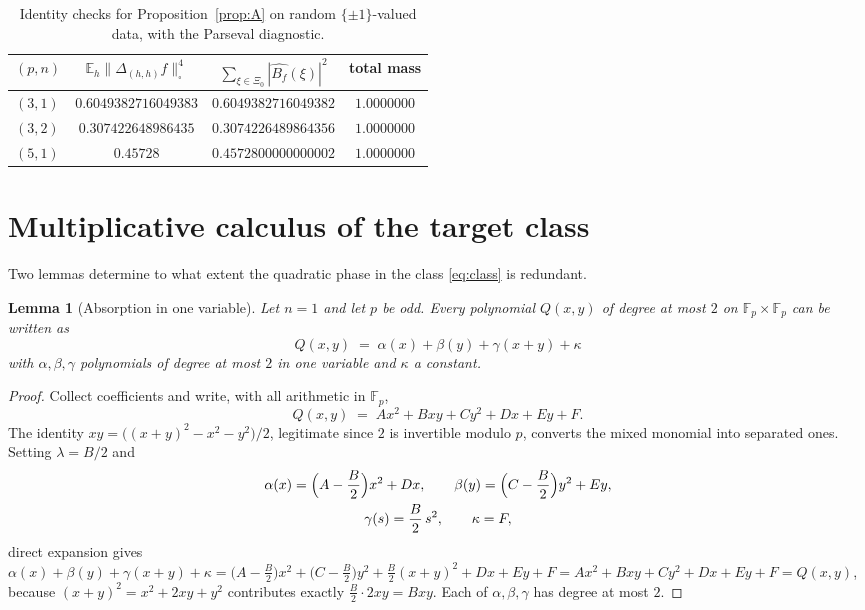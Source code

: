 \documentclass[11pt]{article}
\newtheorem{lemma}{Lemma}
\theoremstyle{remark}
\begin{document}
\begin{table}[ht]
\centering
\small
\begin{tabular}{lccc}
\toprule
$(p,n)$ &
$\mathbb{E}_h\|\Delta_{(h,h)}f\|_\square^4$ &
$\sum_{\xi\in\Xi_0}|\widehat{B_f}(\xi)|^2$ &
total mass \\
\midrule
$(3,1)$ & $0.6049382716049383$ & $0.6049382716049382$ & $1.0000000$ \\
$(3,2)$ & $0.307422648986435$  & $0.3074226489864356$ & $1.0000000$ \\
$(5,1)$ & $0.45728$            & $0.4572800000000002$ & $1.0000000$ \\
\bottomrule
\end{tabular}
\caption{Identity checks for Proposition~\ref{prop:A} on random
$\{\pm1\}$-valued data, with the Parseval diagnostic.}
\label{tab:ident}
\end{table}

\section{Multiplicative calculus of the target class}\label{sec:calc}

Two lemmas determine to what extent the quadratic phase in the class
\eqref{eq:class} is redundant.

\begin{lemma}[Absorption in one variable]\label{lem:absorb}
Let $n=1$ and let $p$ be odd. Every polynomial $Q(x,y)$ of degree at most
$2$ on $\mathbb{F}_p\times\mathbb{F}_p$ can be written as
\[
Q(x,y)\;=\;\alpha(x)+\beta(y)+\gamma(x+y)+\kappa
\]
with $\alpha,\beta,\gamma$ polynomials of degree at most $2$ in one variable
and $\kappa$ a constant.
\end{lemma}

\begin{proof}
Collect coefficients and write, with all arithmetic in $\mathbb{F}_p$,
\[
Q(x,y)\;=\;A x^2+B xy+C y^2+Dx+Ey+F.
\]
The identity $xy=\bigl((x+y)^2-x^2-y^2\bigr)/2$, legitimate since $2$ is
invertible modulo $p$, converts the mixed monomial into separated ones.
Setting $\lambda=B/2$ and
\begin{gather*}
\alpha(x)=\Bigl(A-\frac{B}{2}\Bigr)x^2+Dx,\qquad
\beta(y)=\Bigl(C-\frac{B}{2}\Bigr)y^2+Ey,\\
\gamma(s)=\frac{B}{2}\,s^2,\qquad
\kappa=F,
\end{gather*}
direct expansion gives
$\alpha(x)+\beta(y)+\gamma(x+y)+\kappa
=\bigl(A-\tfrac{B}{2}\bigr)x^2+\bigl(C-\tfrac{B}{2}\bigr)y^2
+\tfrac{B}{2}(x+y)^2+Dx+Ey+F
=Ax^2+Bxy+Cy^2+Dx+Ey+F=Q(x,y)$,
because $(x+y)^2=x^2+2xy+y^2$ contributes exactly
$\tfrac{B}{2}\cdot 2xy=Bxy$. Each of $\alpha,\beta,\gamma$ has degree at
most $2$.
\end{proof}
\end{document}
